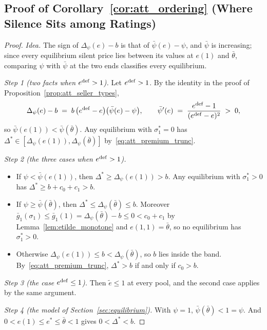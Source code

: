 \subsection*{Proof of Corollary~\ref{cor:att_ordering} (Where Silence Sits among Ratings)}

\begin{proof}\upshape
\emph{Idea.} The sign of $\Delta_\psi(e)-b$ is that of $\bar\psi(e)-\psi$, and $\bar\psi$ is increasing; since every equilibrium silent price lies between its values at $e(1)$ and $\bar\theta$, comparing $\psi$ with $\bar\psi$ at the two ends classifies every equilibrium.

\emph{Step 1 (two facts when $e^{\rm def}>1$).} Let $e^{\rm def}>1$. By the identity in the proof of Proposition~\ref{prop:att_seller_types},
\begin{equation*}
    \Delta_\psi(e)-b\;=\;b\,\big(e^{\rm def}-e\big)\big(\bar\psi(e)-\psi\big),\qquad
    \bar\psi'(e)\;=\;\frac{e^{\rm def}-1}{(e^{\rm def}-e)^2}\;>\;0,
\end{equation*}
so $\bar\psi(e(1))<\bar\psi(\bar\theta)$. Any equilibrium with $\sigma_1^*=0$ has $\Delta^*\in[\Delta_\psi(e(1)),\Delta_\psi(\bar\theta)]$ by~\eqref{eq:att_premium_trunc}.

\emph{Step 2 (the three cases when $e^{\rm def}>1$).}
\begin{itemize}
    \item If $\psi<\bar\psi(e(1))$, then $\Delta^*\ge\Delta_\psi(e(1))>b$. Any equilibrium with $\sigma_1^*>0$ has $\Delta^*\ge b+c_0+c_1>b$.
    \item If $\psi\ge\bar\psi(\bar\theta)$, then $\Delta^*\le\Delta_\psi(\bar\theta)\le b$. Moreover $\bar g_1(\sigma_1)\le\bar g_1(1)=\Delta_\psi(\bar\theta)-b\le0<c_0+c_1$ by Lemma~\ref{lem:etilde_monotone} and $e(1,1)=\bar\theta$, so no equilibrium has $\sigma_1^*>0$.
    \item Otherwise $\Delta_\psi(e(1))\le b<\Delta_\psi(\bar\theta)$, so $b$ lies inside the band. By~\eqref{eq:att_premium_trunc}, $\Delta^*>b$ if and only if $c_0>b$.
\end{itemize}

\emph{Step 3 (the case $e^{\rm def}\le1$).} Then $\tilde e\le1$ at every pool, and the second case applies by the same argument.

\emph{Step 4 (the model of Section~\ref{sec:equilibrium}).} With $\psi=1$, $\bar\psi(\bar\theta)<1=\psi$. And $0<e(1)\le e^*\le\bar\theta<1$ gives $0<\Delta^*<b$.
\end{proof}

